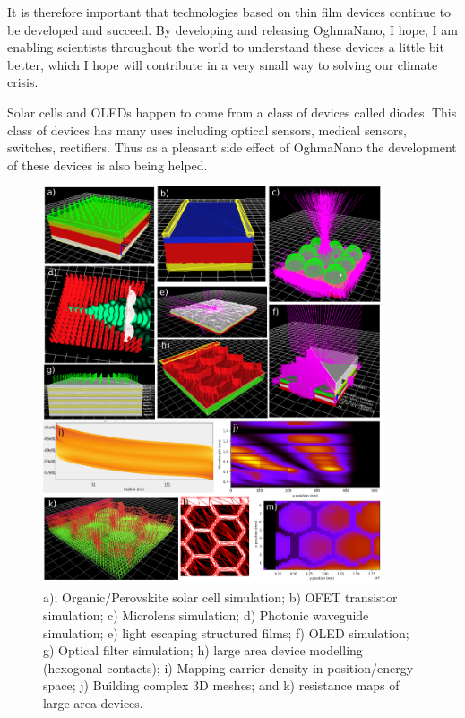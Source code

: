   It is therefore important that technologies based on thin film devices continue to be developed and succeed. By developing and releasing OghmaNano, I hope, I am enabling scientists throughout the world to understand these devices a little bit better, which I hope will contribute in a very small way to solving our climate crisis.

Solar cells and OLEDs happen to come from a class of devices called diodes. This class of devices has many uses including optical sensors, medical sensors, switches, rectifiers. Thus as a pleasant side effect of OghmaNano the development of these devices is also being helped. 

\begin{figure}
\centering
\includegraphics[width=0.9\textwidth]{./images/all_devices.png}
\caption{a); Organic/Perovskite solar cell simulation; b) OFET transistor simulation; c) Microlens simulation; d) Photonic waveguide simulation; e) light escaping structured films; f) OLED simulation; g) Optical filter simulation; h) large area device modelling (hexogonal contacts); i) Mapping carrier density in position/energy space; j) Building complex 3D meshes; and k) resistance maps of large area devices.}
\label{fig:alldevices}
\end{figure}



